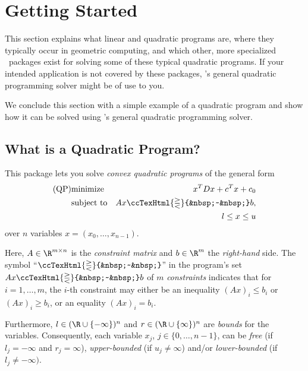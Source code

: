 \newcommand{\qprel}{\ccTexHtml{\gtreqless}{&nbsp;~&nbsp;}}

\label{QP_solver}

\section{Getting Started}
This section explains what linear and quadratic programs are, where
they typically occur in geometric computing, and which other, more
specialized \cgal\ packages exist for solving some of these typical
quadratic programs. If your intended application is not covered
by these packages, \cgal's general quadratic programming solver might
be of use to you.

We conclude this section with a simple example of a quadratic program
and show how it can be solved using \cgal's general quadratic
programming solver.

\subsection{What is a Quadratic Program?}
This package lets you solve \emph{convex quadratic programs} of the 
general form
\begin{eqnarray*}
\mbox{(QP)}&\mbox{minimize} & x^{T}Dx + c^{T}x + c_0 \\
&\mbox{subject to}   & Ax\qprel b, \\
&& l \leq x \leq u
\end{eqnarray*}
over $n$ variables $x=(x_0,\ldots,x_{n-1})$.

Here, $A \in \R^{m \times n}$ is the \emph{constraint matrix} and $b
\in \R^{m}$ the \emph{right-hand} side. The symbol ``$\qprel$'' in the
program's set $Ax \qprel b$ of $m$ \emph{constraints} indicates that for
$i=1,\ldots,m$, the $i$-th constraint may either be an inequality
$(Ax)_i \leq b_i$ or $(Ax)_i \geq b_i$, or an equality $(Ax)_i = b_i$.

Furthermore, $l\in
(\R\cup\{-\infty\})^n$ and $r\in (\R\cup\{\infty\})^n$ are \emph{bounds}
for the variables. Consequently, each
variable $x_j$, $j\in\{0,\ldots,n-1\}$, can be \emph{free} (if
$l_j=-\infty$ and $r_j=\infty$), \emph{upper-bounded} (if
$u_j\neq\infty$) and/or \emph{lower-bounded} (if
$l_j\neq-\infty)$.  

